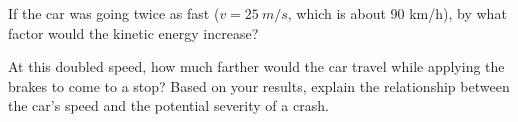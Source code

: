 \documentclass[11pt,addpoints,letterpaper]{exam}
\newcommand{\qspp}{\vspace{2.5cm}}
\begin{document}
\begin{questions}
\vspace{2cm}
\question[2] If the car was going twice as fast ($v=\SI{25}{m/s}$, which is about 90 km/h), by what factor would the kinetic energy increase? 
\vspace{2cm}

\question[3] At this doubled speed, how much farther would the car travel while applying the brakes to come to a stop? 
\qspp
\question[2] Based on your results, explain the relationship between the car's speed and the potential severity of a crash.

\end{questions}
\end{document}
